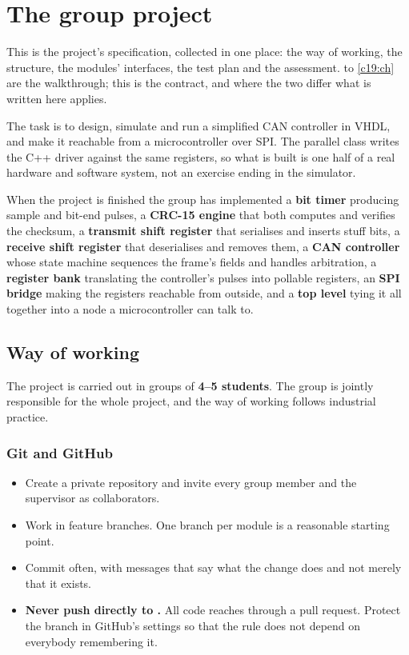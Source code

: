 
\chapter{The group project}
\label{app:project}

This is the project's specification, collected in one place: the way of working, the structure, the
modules' interfaces, the test plan and the assessment.  to \ref{c19:ch} are the
walkthrough; this is the contract, and where the two differ what is written here applies.

The task is to design, simulate and run a simplified CAN controller in VHDL, and make it reachable
from a microcontroller over SPI. The parallel class writes the C++ driver against the same registers,
so what is built is one half of a real hardware and software system, not an exercise ending in the
simulator.

When the project is finished the group has implemented a \textbf{bit timer} producing sample and
bit-end pulses, a \textbf{CRC-15 engine} that both computes and verifies the checksum, a
\textbf{transmit shift register} that serialises and inserts stuff bits, a \textbf{receive shift
register} that deserialises and removes them, a \textbf{CAN controller} whose state machine sequences
the frame's fields and handles arbitration, a \textbf{register bank} translating the controller's
pulses into pollable registers, an \textbf{SPI bridge} making the registers reachable from outside,
and a \textbf{top level} tying it all together into a node a microcontroller can talk to.

\section{Way of working}
\label{app:project:work}

The project is carried out in groups of \textbf{4--5 students}. The group is jointly responsible for
the whole project, and the way of working follows industrial practice.

\subsection{Git and GitHub}
\begin{itemize}
  \item Create a private repository and invite every group member and the supervisor as
    collaborators.
  \item Work in feature branches. One branch per module is a reasonable starting point.
  \item Commit often, with messages that say what the change does and not merely that it exists.
  \item \textbf{Never push directly to .} All code reaches  through a pull
    request. Protect the branch in GitHub's settings so that the rule does not depend on everybody
    remembering it.
\end{itemize}

